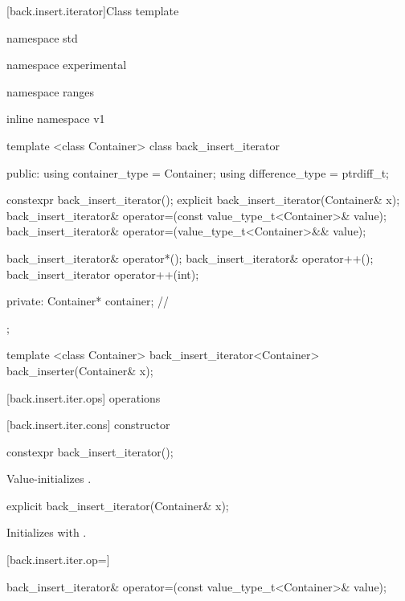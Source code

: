 [back.insert.iterator]{Class template }

%
\begin{codeblock}
namespace std { namespace experimental { namespace ranges { inline namespace v1 {
  template <class Container>
  class back_insert_iterator {
  public:
    using container_type = Container;
    using difference_type = ptrdiff_t;

    constexpr back_insert_iterator();
    explicit back_insert_iterator(Container& x);
    back_insert_iterator&
      operator=(const value_type_t<Container>& value);
    back_insert_iterator&
      operator=(value_type_t<Container>&& value);

    back_insert_iterator& operator*();
    back_insert_iterator& operator++();
    back_insert_iterator operator++(int);

  private:
    Container* container; // \expos
  };

  template <class Container>
    back_insert_iterator<Container> back_inserter(Container& x);
}}}}
\end{codeblock}

[back.insert.iter.ops]{ operations}

[back.insert.iter.cons]{ constructor}

%
\begin{itemdecl}
constexpr back_insert_iterator();
\end{itemdecl}

\begin{itemdescr}
\pnum
\effects
Value-initializes
.
\end{itemdescr}

%

\begin{itemdecl}
explicit back_insert_iterator(Container& x);
\end{itemdecl}

\begin{itemdescr}
\pnum
\effects
Initializes
with .
\end{itemdescr}

[back.insert.iter.op=]{}

%
\begin{itemdecl}
back_insert_iterator&
  operator=(const value_type_t<Container>& value);
\end{itemdecl}

